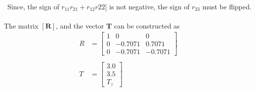 \documentclass[]{article}
\begin{document}
\\\
\indent Since, the sign of $r_{11}r_{21}+r_{12}r{22}]$ is not negative, the sign of $r_{23}$ must be flipped.\\
\\
\indent The matrix $[\textbf{R}]$, and the vector $\textbf{T}$ can be constructed as
\begin{align*}
R &=
\begin{bmatrix}
1 & 0 & 0\\
0 & -0.7071 & 0.7071\\
0 & -0.7071 & -0.7071
\end{bmatrix}\\
\\
T &=
\begin{bmatrix}
3.0\\
3.5\\
T_z
\end{bmatrix}\\
\end{align*}
\end{document}

